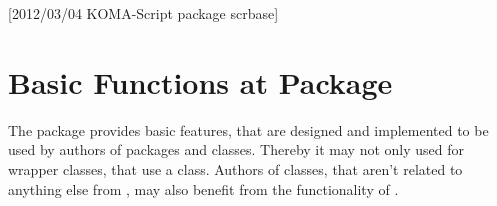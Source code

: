 %
%
%
%
%
%
%
%
% 
%
%
%
%

[2012/03/04 KOMA-Script package scrbase]


\chapter{Basic Functions at Package }

%

The package  provides basic features, that are designed and
implemented to be used by authors of packages and classes. Thereby it may not
only used for wrapper classes, that use a \KOMAScript{} class. Authors of
classes, that aren't related to anything else from \KOMAScript{}, may also
benefit from the functionality of .

